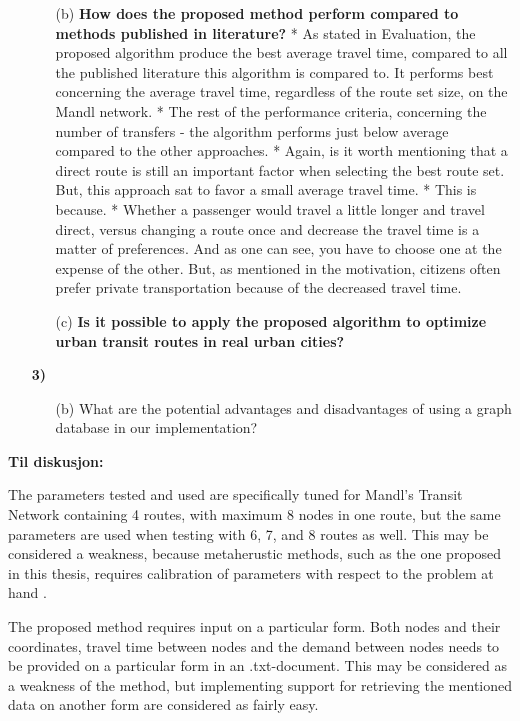 \begin{enumerate}[label=\textbf{\arabic*})]
\begin{enumerate}
    \item[(b)]  \textbf{How does the proposed method perform compared to methods published in literature?}
    * As stated in Evaluation, the proposed algorithm produce the best average travel time, compared to all the published literature this algorithm is compared to. It performs best concerning the average travel time, regardless of the route set size, on the Mandl network. 
    * The rest of the performance criteria, concerning the number of transfers - the algorithm performs just below average compared to the other approaches. 
    * Again, is it worth mentioning that a direct route is still an important factor when selecting the best route set. But, this approach sat to favor a small average travel time.
    * This is because. 
    * Whether a passenger would travel a little longer and travel direct, versus changing a route once and decrease the travel time is a matter of preferences. And as one can see, you have to choose one at the expense of the other. But, as mentioned in the motivation, citizens often prefer private transportation because of the decreased travel time. 

    \item[(c)]  \textbf{Is it possible to apply the proposed algorithm to optimize urban transit routes in real urban cities?}


    \end{enumerate}
\item[\textbf{3)}]
	\begin{enumerate}
	\item[(b)]  What are the potential advantages and disadvantages of using a graph database in our implementation?
    \end{enumerate}
\end{enumerate}

\textbf{\color{blue} Til diskusjon:}

The parameters tested and used are specifically tuned for Mandl's Transit Network containing 4 routes, with maximum 8 nodes in one route, but the same parameters are used when testing with 6, 7, and 8 routes as well. This may be considered a weakness, because metaherustic methods, such as the one proposed in this thesis, requires calibration of parameters with respect to the problem at hand \citep{dobslaw09}.

The proposed method requires input on a particular form. Both nodes and their coordinates, travel time between nodes and the demand between nodes needs to be provided on a particular form in an .txt-document. This may be considered as a weakness of the method, but implementing support for retrieving the mentioned data on another form are considered as fairly easy.

